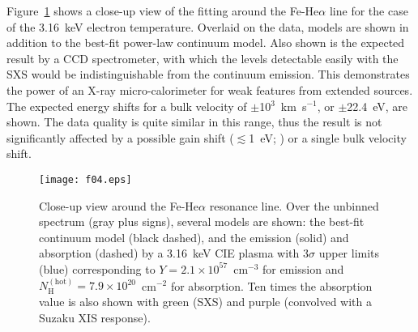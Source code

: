 \documentclass[]{pasj01}
\begin{document}
Figure~\ref{f04} shows a close-up view of the fitting around the Fe-He$\alpha$ line for
the case of the 3.16~keV electron temperature. Overlaid on the data, models are shown in
addition to the best-fit power-law continuum model. Also shown is the expected result by
a CCD spectrometer, with which the levels detectable easily with the SXS would be
indistinguishable from the continuum emission. This demonstrates the power of an X-ray
micro-calorimeter for weak features from extended sources. The expected energy shifts
for a bulk velocity of $\pm$10$^{3}$~km~s$^{-1}$, or $\pm$22.4~eV, are shown. The data
quality is quite similar in this range, thus the result is not significantly affected by
a possible gain shift ($\lesssim$1~eV; \cite{hitomi16}) or a single bulk velocity shift.

\begin{figure}
 \begin{center}
  \texttt{[image: f04.eps]}
 \end{center}
 \caption{Close-up view around the Fe-He$\alpha$ resonance line. Over the unbinned
 spectrum (gray plus signs), several models are shown: the best-fit continuum model (black
 dashed), and the emission (solid) and absorption (dashed) by a 3.16~keV CIE plasma with
 3$\sigma$ upper limits (blue) corresponding to $Y=2.1 \times 10^{57}$~cm$^{-3}$ for
 emission and $N_{\mathrm{H}}^{\mathrm{(hot)}}=7.9 \times 10^{20}$~cm$^{-2}$ for
 absorption. Ten times the absorption value is also shown with green (SXS) and purple
 (convolved with a Suzaku XIS response).}
 \label{f04}
\end{figure}
\end{document}
